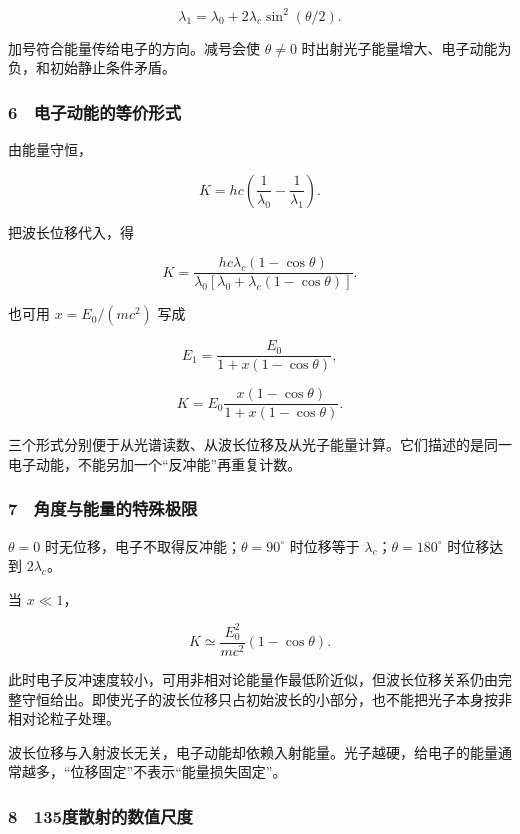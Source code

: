 \documentclass[12pt,a4paper,fontset=fandol]{ctexart}
\begin{document}
\[\boxed{\lambda_1=\lambda_0+2\lambda_c\sin^2(\theta/2).}\]

加号符合能量传给电子的方向。减号会使 \(\theta\ne0\)
时出射光子能量增大、电子动能为负，和初始静止条件矛盾。

\subsubsection{6　电子动能的等价形式}\label{ux7535ux5b50ux52a8ux80fdux7684ux7b49ux4ef7ux5f62ux5f0f}

由能量守恒，

\[\boxed{K=hc\left(\frac1{\lambda_0}-\frac1{\lambda_1}\right).}\]

把波长位移代入，得

\[\boxed{K=
\frac{hc\lambda_c(1-\cos\theta)}
{\lambda_0[\lambda_0+\lambda_c(1-\cos\theta)]}.}\]

也可用 \(x=E_0/(mc^2)\) 写成

\[E_1=\frac{E_0}{1+x(1-\cos\theta)},\]

\[\boxed{K=E_0\frac{x(1-\cos\theta)}{1+x(1-\cos\theta)}.}\]

三个形式分别便于从光谱读数、从波长位移及从光子能量计算。它们描述的是同一电子动能，不能另加一个``反冲能''再重复计数。

\subsubsection{7　角度与能量的特殊极限}\label{ux89d2ux5ea6ux4e0eux80fdux91cfux7684ux7279ux6b8aux6781ux9650}

\(\theta=0\) 时无位移，电子不取得反冲能；\(\theta=90^\circ\) 时位移等于
\(\lambda_c\)；\(\theta=180^\circ\) 时位移达到 \(2\lambda_c\)。

当 \(x\ll1\)，

\[K\simeq\frac{E_0^2}{mc^2}(1-\cos\theta).\]

此时电子反冲速度较小，可用非相对论能量作最低阶近似，但波长位移关系仍由完整守恒给出。即使光子的波长位移只占初始波长的小部分，也不能把光子本身按非相对论粒子处理。

波长位移与入射波长无关，电子动能却依赖入射能量。光子越硬，给电子的能量通常越多，``位移固定''不表示``能量损失固定''。

\subsubsection{8　135度散射的数值尺度}\label{ux5ea6ux6563ux5c04ux7684ux6570ux503cux5c3aux5ea6}
\end{document}
